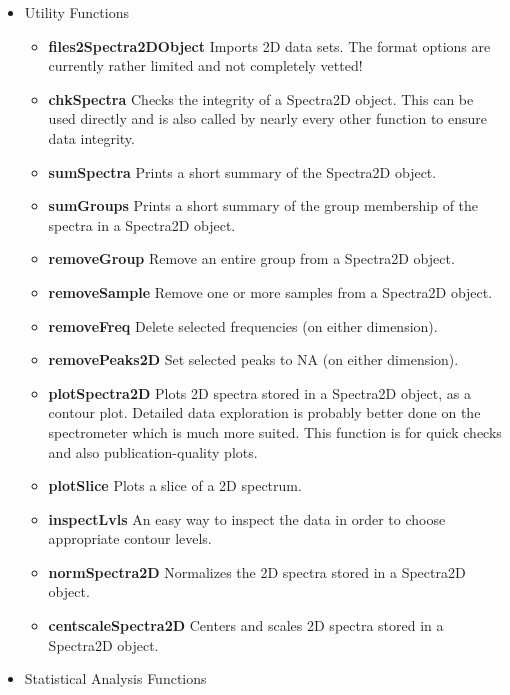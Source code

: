 \documentclass[letter,10pt,twocolumn,twoside,printwatermark=false]{pinp}
\providecommand{\tightlist}{%
  \setlength{\itemsep}{0pt}\setlength{\parskip}{0pt}}
\begin{document}
\begin{itemize}
\tightlist
\item
  Utility Functions

  \begin{itemize}
  \tightlist
  \item
    \textbf{files2Spectra2DObject} Imports 2D data sets. The format
    options are currently rather limited and not completely vetted!
  \item
    \textbf{chkSpectra} Checks the integrity of a Spectra2D object. This
    can be used directly and is also called by nearly every other
    function to ensure data integrity.
  \item
    \textbf{sumSpectra} Prints a short summary of the Spectra2D object.
  \item
    \textbf{sumGroups} Prints a short summary of the group membership of
    the spectra in a Spectra2D object.
  \item
    \textbf{removeGroup} Remove an entire group from a Spectra2D object.
  \item
    \textbf{removeSample} Remove one or more samples from a Spectra2D
    object.
  \item
    \textbf{removeFreq} Delete selected frequencies (on either
    dimension).
  \item
    \textbf{removePeaks2D} Set selected peaks to NA (on either
    dimension).
  \item
    \textbf{plotSpectra2D} Plots 2D spectra stored in a Spectra2D
    object, as a contour plot. Detailed data exploration is probably
    better done on the spectrometer which is much more suited. This
    function is for quick checks and also publication-quality plots.
  \item
    \textbf{plotSlice} Plots a slice of a 2D spectrum.
  \item
    \textbf{inspectLvls} An easy way to inspect the data in order to
    choose appropriate contour levels.
  \item
    \textbf{normSpectra2D} Normalizes the 2D spectra stored in a
    Spectra2D object.
  \item
    \textbf{centscaleSpectra2D} Centers and scales 2D spectra stored in
    a Spectra2D object.
  \end{itemize}
\item
  Statistical Analysis Functions


\end{itemize}
\end{document}
